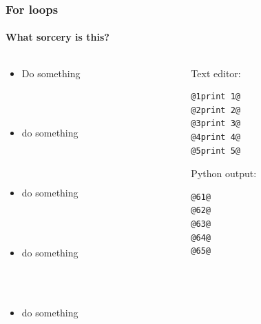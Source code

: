 \documentclass{beamer}
\begin{document}
\begin{frame}[fragile]
\frametitle{For loops}
\framesubtitle{What sorcery is this?}
\large
  \begin{columns}[T]
    \begin{column}{.5\textwidth} 


\begin{itemize}


\item<1-> {Do something}

\ \\

\ \\

\item<2-> {do something}

\ \\
\ \\


\item<3-> {do something}

\ \\
\ \\


\item<4-> {do something}

\ \\

\ \\

\item<5-> {do something}





\end{itemize}
     \end{column}
     
         \begin{column}{.5\textwidth} 
         Text editor:
\begin{lstlisting}[style=base]
@1print 1@
@2print 2@
@3print 3@
@4print 4@
@5print 5@

\end{lstlisting}

Python output:\begin{lstlisting}[style=base]
@61@
@62@
@63@
@64@
@65@


\end{lstlisting}

    \end{column}
    \end{columns}

\end{frame}
\end{document}
